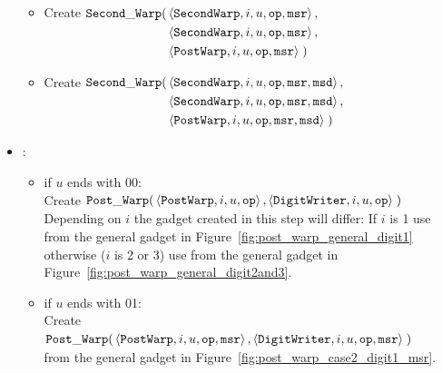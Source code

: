 \begin{itemize}
\begin{itemize}
        \item Create
        $\begin{aligned}[t]
            {\tt Second\_Warp}(& \left\langle {\tt SecondWarp}, i, u, {\tt op}, {\tt msr} \right\rangle, \\
                        & \left\langle {\tt SecondWarp}, i, u, {\tt op}, {\tt msr} \right\rangle, \\
                        & \left\langle {\tt PostWarp},   i, u, {\tt op}, {\tt msr} \right\rangle \;)
        \end{aligned}$
        \vspace{0.5cm}

        \item Create
        $\begin{aligned}[t]
            {\tt Second\_Warp}(& \left\langle {\tt SecondWarp}, i, u, {\tt op}, {\tt msr}, {\tt msd} \right\rangle, \\
                        & \left\langle {\tt SecondWarp}, i, u, {\tt op}, {\tt msr}, {\tt msd} \right\rangle, \\
                        & \left\langle {\tt PostWarp},   i, u, {\tt op}, {\tt msr}, {\tt msd} \right\rangle \;)
        \end{aligned}$
        \vspace{0.5cm}
        \end{itemize}

        \item {\postwarp}:
        \begin{itemize}
           \item if $u$ ends with 00:\\
            Create
            $\begin{aligned}[t]
                {\tt Post\_Warp}(& \left \langle {\tt PostWarp},  i, u,   {\tt op} \right\rangle,
                            \left \langle {\tt DigitWriter}, i, u, {\tt op} \right\rangle \;)
            \end{aligned}$ \\
            Depending on $i$ the gadget created in this step will differ:
            If $i$ is 1 use from the general gadget in Figure~\ref{fig:post_warp_general_digit1}
            otherwise  ($i$ is 2 or 3) use from the general gadget in Figure~\ref{fig:post_warp_general_digit2and3}.
            \vspace{.5cm}

            \item if $u$ ends with 01:\\
            Create
            $\begin{aligned}[t]
                {\tt Post\_Warp}(& \left \langle {\tt PostWarp},    i, u, {\tt op}, {\tt msr} \right\rangle,
                            \left \langle {\tt DigitWriter}, i, u, {\tt op}, {\tt msr} \right\rangle \;)
            \end{aligned}$ \\
            from the general gadget in Figure~\ref{fig:post_warp_case2_digit1_msr}.
            \vspace{.5cm}


\end{itemize}
\end{itemize}
